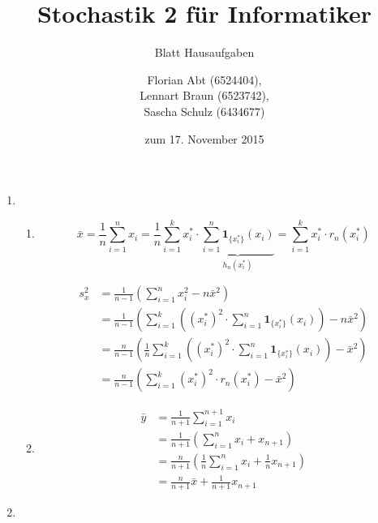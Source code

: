 \documentclass[a4paper]{scrartcl}
\title{Stochastik 2 für Informatiker}
\subtitle{Blatt {\blattnr} Hausaufgaben}
\author{
    Florian Abt (6524404), \\
    Lennart Braun (6523742), \\
    Sascha Schulz (6434677)
}
\date{zum 17. November 2015}
\def \blattnr {6}
\begin{document}
\maketitle

\begin{enumerate}[label=\bfseries \blattnr.\arabic*]

\item 
\begin{enumerate}
 \item 
 
 \begin{equation*}
      \bar{x} 
      = \frac1n \sum_{i=1}^n x_i 
      = \frac1n \sum_{i=1}^k x_i^* \cdot \underbrace{\sum_{i=1}^n \textbf{1}_{\{x_i^*\}}(x_i)}_{h_n(x_i^*)}
      = \sum_{i=1}^k x_i^* \cdot r_n(x_i^*)
 \end{equation*}
 
 \begin{equation*}
  \begin{split}
     s_x^2 
     &= \frac1{n-1} \left( \sum_{i=1}^n x_i^2 - n\bar{x}^2 \right) \\
     &= \frac1{n-1} \left( \sum_{i=1}^k \left( (x_i^*)^2 \cdot \sum_{i=1}^n \textbf{1}_{\{x_i^*\}}(x_i) \right) - n\bar{x}^2  \right) \\
     &= \frac{n}{n-1} \left(\frac1n \sum_{i=1}^k \left( (x_i^*)^2 \cdot \sum_{i=1}^n \textbf{1}_{\{x_i^*\}}(x_i) \right) - \bar{x}^2  \right) \\
     &= \frac{n}{n-1} \left( \sum_{i=1}^k (x_i^*)^2 \cdot r_n(x_i^*) - \bar{x}^2  \right) 
     \end{split}
 \end{equation*}
 
 \item 
 \begin{equation*}
  \begin{split}
      \bar{y} 
      &= \frac1{n+1} \sum_{i=1}^{n+1} x_i  \\
      &= \frac1{n+1} \left( \sum_{i=1}^{n} x_i + x_{n+1} \right) \\
      &= \frac{n}{n+1} \left( \frac1n \sum_{i=1}^{n} x_i + \frac1n x_{n+1} \right) \\
      &= \frac{n}{n+1} \bar{x} + \frac1{n+1} x_{n+1}
  \end{split}
 \end{equation*}
 
\end{enumerate}

\item 


\end{enumerate}
\end{document}
